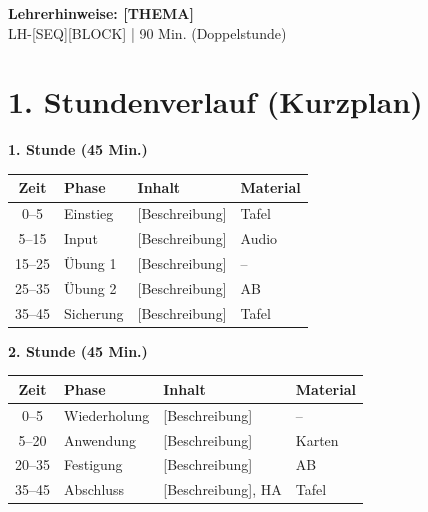 \documentclass[11pt, a4paper]{article}
\newcommand{\fachfarbe}{spanisch}
\newcommand{\thema}{[THEMA]}
\newcommand{\sequenz}{[SEQ]}
\newcommand{\block}{[BLOCK]}
\newcommand{\dauer}{90 Min. (Doppelstunde)}
\begin{document}

\begin{center}
    {\Large\bfseries\textcolor{\fachfarbe}{Lehrerhinweise: \thema}}\\[0.3em]
    {\normalsize LH-\sequenz\block{} | \dauer}
\end{center}

\vspace{10pt}


\section*{1. Stundenverlauf (Kurzplan)}

\textbf{1. Stunde (45 Min.)}

\begin{tabularx}{\textwidth}{|c|l|X|l|}
\hline
\textbf{Zeit} & \textbf{Phase} & \textbf{Inhalt} & \textbf{Material} \\
\hline
0--5 & Einstieg & [Beschreibung] & Tafel \\
\hline
5--15 & Input & [Beschreibung] & Audio \\
\hline
15--25 & Übung 1 & [Beschreibung] & -- \\
\hline
25--35 & Übung 2 & [Beschreibung] & AB \\
\hline
35--45 & Sicherung & [Beschreibung] & Tafel \\
\hline
\end{tabularx}

\vspace{1em}

\textbf{2. Stunde (45 Min.)}

\begin{tabularx}{\textwidth}{|c|l|X|l|}
\hline
\textbf{Zeit} & \textbf{Phase} & \textbf{Inhalt} & \textbf{Material} \\
\hline
0--5 & Wiederholung & [Beschreibung] & -- \\
\hline
5--20 & Anwendung & [Beschreibung] & Karten \\
\hline
20--35 & Festigung & [Beschreibung] & AB \\
\hline
35--45 & Abschluss & [Beschreibung], HA & Tafel \\
\hline
\end{tabularx}
\end{document}
